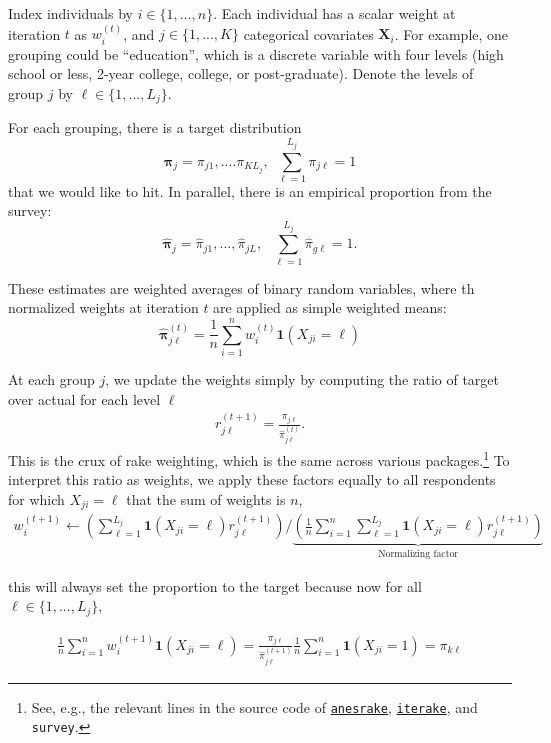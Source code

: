 \documentclass[11pt]{article}
\begin{document}
Index individuals by \(i \in \{1, ..., n\}\). Each individual has a scalar weight at iteration \(t\) as \(w^{(t)}_i\), and \(j \in \{1, ..., K\}\) categorical covariates \(\bm{X}_i\). For example, one grouping could be ``education'', which is a discrete variable with four levels (high school or less, 2-year college, college, or post-graduate). Denote the levels of group \(j\) by \(\ell \in \{1, ..., L_j\}\). 

For each grouping, there is a target distribution \[\bm{\pi}_j = \pi_{j1}, .... \pi_{KL_j}, ~~ \sum^{L_{j}}_{\ell = 1}\pi_{j\ell} = 1\] that we would like to hit. In parallel, there is an empirical proportion from the survey: \[\widehat{\bm{\pi}}_j = \widehat{\pi}_{j1},  ..., \widehat{\pi}_{jL}, ~~~\sum^{L_{j}}_{\ell = 1}\hat{\pi}_{g\ell} = 1.\]

These estimates are weighted averages of binary random variables, where th normalized weights at iteration \(t\) are applied as simple weighted means:
\[\bm{\widehat{\pi}}^{(t)}_{j\ell} = \frac{1}{n}\sum^n_{i=1}w_i^{(t)} \mathbf{1}(X_{ji} = \ell)\]

At each group \(j\), we update the weights simply by computing the ratio of target over actual for each level \(\ell\)
\begin{align}
r_{j\ell}^{(t+1)} = \frac{\pi_{j\ell}}{\widehat{\pi}^{(t)}_{j\ell}}.
\end{align}
This is the crux of rake weighting, which is the same across various packages.\footnote{See, e.g.,  the relevant lines in the source code of \href{https://github.com/cran/anesrake/blob/cb086d4f1712d71458e86c710b0e88343e06d567/R/rakeonvar.factor.R\#L38-L40}{\texttt{anesrake}}, \href{https://github.com/ttrodrigz/iterake/blob/181fcd2cef936533934a5bc7aefe0011b9b2ef41/R/iterake.R\#L263}{\texttt{iterake}}, and {\texttt{survey}}.} To interpret this ratio as weights, we apply these factors equally to all respondents for which \(X_{ji} = \ell\) that the sum of weights is \(n\),
\begin{align}
w_i^{(t+1)} \leftarrow \left(\sum^{L_j}_{\ell = 1}\mathbf{1}(X_{ji} = \ell)r_{j\ell}^{(t+1)}\right) \bigg / \underbrace{\left(\frac{1}{n}\sum^n_{i=1}\sum^{L_j}_{\ell = 1}\mathbf{1}(X_{ji} = \ell)r_{j\ell}^{(t+1)}\right)}_{\text{Normalizing factor}}
\end{align}

this will always set the proportion to the target because now for all \( \ell \in \{1, ..., L_j\},\)

\begin{align}
\frac{1}{n}\sum^n_{i=1}w_i^{(t+1)} \mathbf{1}(X_{ji} = \ell) =\frac{\pi_{j\ell}}{\widehat{\pi}^{(t+1)}_{j\ell}}\frac{1}{n}\sum^n_{i=1}\mathbf{1}(X_{ji} = 1) = \pi_{k\ell}
\end{align}
\end{document}
